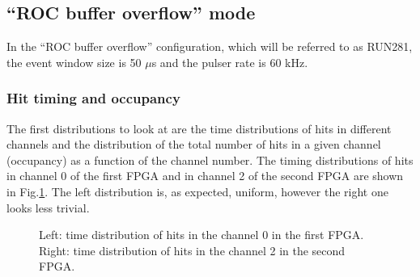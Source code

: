 \subsection{``ROC buffer overflow'' mode}
In the ``ROC buffer overflow'' configuration, which will be referred to as RUN281, the event window size is 50 $\mu$s
and the pulser rate is 60 kHz.

\subsubsection{Hit timing and occupancy}\label{over}
The first distributions to look at are the time distributions of hits in 
different channels and the distribution of the total number of hits
in a given channel (occupancy) as a function of the channel number.
The timing distributions of hits in channel 0 of the first FPGA
and in channel 2 of the second FPGA are shown in Fig.\ref{fig:1}.
The left distribution is, as expected, uniform, however the right one looks
less trivial.

\begin{figure}[!h]
  \hspace{-0.5in}
  \caption{
    \label{fig:1}
    Left: time distribution of hits in the channel 0 in the first FPGA. Right: time distribution of hits in the channel 2 in the second FPGA.
    }
\end{figure}

